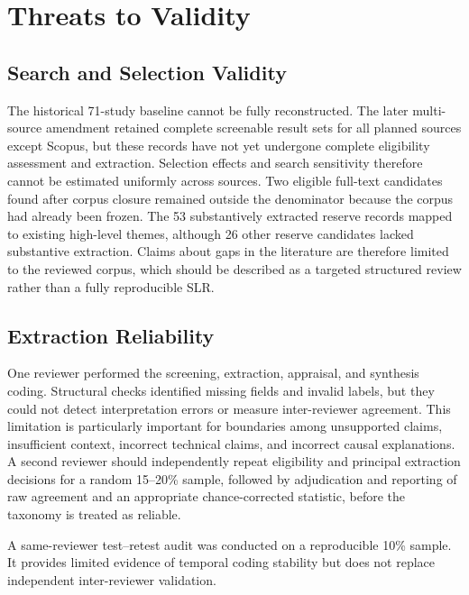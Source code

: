 \documentclass[10pt]{article}
\begin{document}

\section{Threats to Validity}

\subsection{Search and Selection Validity}

The historical 71-study baseline cannot be fully reconstructed. The later multi-source amendment retained complete screenable result sets for all planned sources except Scopus, but these records have not yet undergone complete eligibility assessment and extraction. Selection effects and search sensitivity therefore cannot be estimated uniformly across sources. Two eligible full-text candidates found after corpus closure remained outside the denominator because the corpus had already been frozen. The 53 substantively extracted reserve records mapped to existing high-level themes, although 26 other reserve candidates lacked substantive extraction. Claims about gaps in the literature are therefore limited to the reviewed corpus, which should be described as a targeted structured review rather than a fully reproducible SLR.

\subsection{Extraction Reliability}

One reviewer performed the screening, extraction, appraisal, and synthesis coding. Structural checks identified missing fields and invalid labels, but they could not detect interpretation errors or measure inter-reviewer agreement. This limitation is particularly important for boundaries among unsupported claims, insufficient context, incorrect technical claims, and incorrect causal explanations. A second reviewer should independently repeat eligibility and principal extraction decisions for a random 15--20\% sample, followed by adjudication and reporting of raw agreement and an appropriate chance-corrected statistic, before the taxonomy is treated as reliable.

A same-reviewer test--retest audit was conducted on a reproducible 10\% sample. It provides limited evidence of temporal coding stability but does not replace independent inter-reviewer validation.
\end{document}
